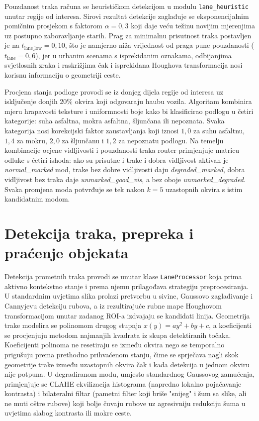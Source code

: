 Pouzdanost traka računa se heurističkom detekcijom u modulu \texttt{lane\_heuristic} unutar regije od interesa. Sirovi rezultat detekcije zaglađuje se eksponencijalnim pomičnim prosjekom s faktorom $\alpha = 0{,}3$ koji daje veću težinu novijim mjerenjima uz postupno zaboravljanje starih. Prag za minimalnu prisutnost traka postavljen je na $t_{\text{lane\_low}} = 0{,}10$, što je namjerno niža vrijednost od praga pune pouzdanosti ($t_{\text{lane}} = 0{,}6$), jer u urbanim scenama s isprekidanim oznakama, odbijanjima svjetlosnih zraka i raskrižjima čak i isprekidana Houghova transformacija nosi korisnu informaciju o geometriji ceste.

Procjena stanja podloge provodi se iz donjeg dijela regije od interesa uz isključenje donjih 20\% okvira koji odgovaraju haubu vozila. Algoritam kombinira mjeru hrapavosti teksture i uniformnosti boje kako bi klasificirao podlogu u četiri kategorije: suha asfaltna, mokra asfaltna, šljunčana ili nepoznata. Svaka kategorija nosi korekcijski faktor zaustavljanja koji iznosi $1{,}0$ za suhu asfaltnu, $1{,}4$ za mokru, $2{,}0$ za šljunčanu i $1{,}2$ za nepoznatu podlogu. Na temelju kombinacije ocjene vidljivosti i pouzdanosti traka router primjenjuje matricu odluke s četiri ishoda: ako su prisutne i trake i dobra vidljivost aktivan je \textit{normal\_marked} mod, trake bez dobre vidljivosti daju \textit{degraded\_marked}, dobra vidljivost bez traka daje \textit{unmarked\_good\_vis}, a bez oboje \textit{unmarked\_degraded}. Svaka promjena moda potvrđuje se tek nakon $k = 5$ uzastopnih okvira s istim kandidatnim modom.



\section{Detekcija traka, prepreka i praćenje objekata}

Detekcija prometnih traka provodi se unutar klase \texttt{LaneProcessor} koja prima aktivno kontekstno stanje i prema njemu prilagođava strategiju preprocesiranja. U standardnim uvjetima slika prolazi pretvorbu u sivine, Gaussovo zaglađivanje i Cannyjevu detekciju rubova, a iz rezultirajuće rubne mape Houghovom transformacijom unutar zadanog ROI-a izdvajaju se kandidati linija. Geometrija trake modelira se polinomom drugog stupnja $x(y) = ay^2 + by + c$, a koeficijenti se procjenjuju metodom najmanjih kvadrata iz skupa detektiranih točaka. Koeficijenti polinoma ne resetiraju se između okvira nego se temporalno prigušuju prema prethodno prihvaćenom stanju, čime se sprječava nagli skok geometrije trake između uzastopnih okvira čak i kada detekcija u jednom okviru nije potpuna. U degradiranom modu, umjesto standardnog Gaussovog zamućenja, primjenjuje se CLAHE ekvilizacija histograma (napredno lokalno pojačavanje kontrasta) i bilateralni filtar (pametni filter koji briše "snijeg" i šum sa slike, ali ne muti oštre rubove) koji bolje čuvaju rubove uz agresivniju redukciju šuma u uvjetima slabog kontrasta ili mokre ceste.

